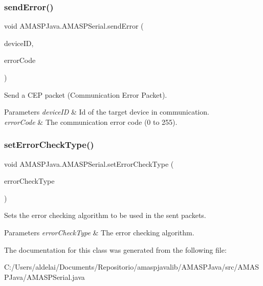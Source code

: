 \subsubsection{\texorpdfstring{send\+Error()}{sendError()}}
{\footnotesize\ttfamily void A\+M\+A\+S\+P\+Java.\+A\+M\+A\+S\+P\+Serial.\+send\+Error (\begin{DoxyParamCaption}\item[{int}]{device\+ID,  }\item[{int}]{error\+Code }\end{DoxyParamCaption})}

Send a C\+EP packet (Communication Error Packet).


\begin{DoxyParams}{Parameters}
{\em device\+ID} & Id of the target device in communication. \\
\hline
{\em error\+Code} & The communication error code (0 to 255). \\
\hline
\end{DoxyParams}
\mbox{\label{class_a_m_a_s_p_java_1_1_a_m_a_s_p_serial_ac5c88aa9168fb1e962705a47f86c9f3d}} 
\subsubsection{\texorpdfstring{set\+Error\+Check\+Type()}{setErrorCheckType()}}
{\footnotesize\ttfamily void A\+M\+A\+S\+P\+Java.\+A\+M\+A\+S\+P\+Serial.\+set\+Error\+Check\+Type (\begin{DoxyParamCaption}\item[{\hyperlink{enum_a_m_a_s_p_java_1_1_a_m_a_s_p_serial_1_1_error_check_type}{Error\+Check\+Type}}]{error\+Check\+Type }\end{DoxyParamCaption})}

Sets the error checking algorithm to be used in the sent packets.


\begin{DoxyParams}{Parameters}
{\em error\+Check\+Type} & The error checking algorithm. \\
\hline
\end{DoxyParams}


The documentation for this class was generated from the following file\+:\begin{DoxyCompactItemize}
\item 
C\+:/\+Users/aldelai/\+Documents/\+Repositorio/amaspjavalib/\+A\+M\+A\+S\+P\+Java/src/\+A\+M\+A\+S\+P\+Java/A\+M\+A\+S\+P\+Serial.\+java\end{DoxyCompactItemize}
